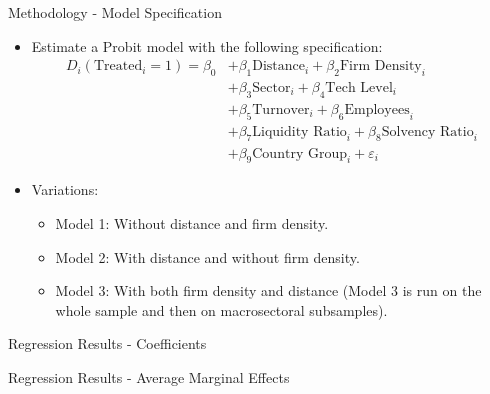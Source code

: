 \documentclass{beamer}
\begin{document}
\begin{frame}{Methodology - Model Specification}
    \begin{itemize}
        \item Estimate a Probit model with the following specification: 
        \begin{equation*}
        \begin{split}
            D_{i}(\text{Treated}_{i} = 1) = \beta_{0} &+ \beta_{1} \text{Distance}_{i} + \beta_{2} \text{Firm Density}_{i} \\
            &+ \beta_{3} \text{Sector}_{i} + \beta_{4} \text{Tech Level}_{i} \\
            &+ \beta_{5} \text{Turnover}_{i} + \beta_{6} \text{Employees}_{i} \\
            &+ \beta_{7} \text{Liquidity Ratio}_{i} + \beta_{8} \text{Solvency Ratio}_{i} \\
            &+ \beta_{9} \text{Country Group}_{i} + \varepsilon_{i}
        \end{split}
    \end{equation*}
    \item Variations:
        \begin{itemize}
            \item Model 1: Without distance and firm density.
            \item Model 2: With distance and without firm density.
            \item Model 3: With both firm density and distance (Model 3 is run on the whole sample and then on macrosectoral subsamples).
        \end{itemize}
    \end{itemize}
\end{frame}

\begin{frame}{Regression Results - Coefficients}
    
\end{frame}

\begin{frame}{Regression Results - Average Marginal Effects}
    
\end{frame}
\end{document}
